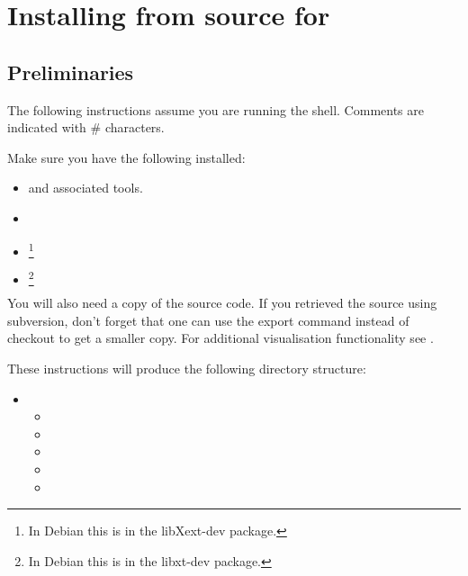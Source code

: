 %
%
%

\section{Installing from source for \linux}
\label{sec:srclinux}

\subsection{Preliminaries}

The following instructions assume you are running the  shell.
Comments are indicated with \# characters.

Make sure you have the following installed:
\begin{itemize}
 \item {} and associated tools.
 \item {}
 \item {}\footnote{In Debian this is in the libXext-dev package.}
 \item {}\footnote{In Debian this is in the libxt-dev package.}
\end{itemize}

You will also need a copy of the \esfinley source code.
If you retrieved the source using subversion, don't forget that one can use the export command instead of checkout to get a smaller copy.
For additional visualisation functionality see .

These instructions will produce the following directory structure:
\begin{itemize}
 \item[]  \begin{itemize}
  \item[] 
  \item[] 
  \item[] 
  \item[] 
  \item[] 
 \end{itemize}
\end{itemize}

